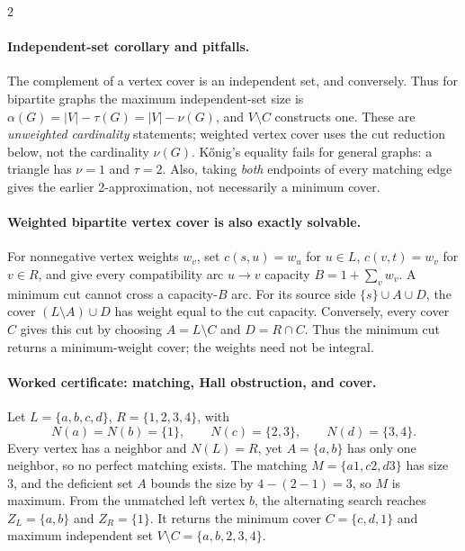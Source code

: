 \documentclass[8pt]{extarticle}
\theoremstyle{definition}
\begin{document}
\begin{multicols*}{2}
\paragraph{Independent-set corollary and pitfalls.}
The complement of a vertex cover is an independent set, and conversely.
Thus for bipartite graphs the maximum independent-set size is
$\alpha(G)=|V|-\tau(G)=|V|-\nu(G)$, and $V\setminus C$ constructs one.
These are \emph{unweighted cardinality} statements; weighted vertex cover
uses the cut reduction below, not the cardinality $\nu(G)$.
K\H{o}nig's equality fails for general graphs: a triangle has $\nu=1$ and
$\tau=2$. Also, taking \emph{both} endpoints of every matching edge gives
the earlier 2-approximation, not necessarily a minimum cover.

\begin{samepage}
\paragraph{Weighted bipartite vertex cover is also exactly solvable.}
For nonnegative vertex weights $w_v$, set $c(s,u)=w_u$ for $u\in L$,
$c(v,t)=w_v$ for $v\in R$, and give every compatibility arc $u\to v$
capacity $B=1+\sum_v w_v$. A minimum cut cannot cross a capacity-$B$ arc.
For its source side $\{s\}\cup A\cup D$, the cover
$(L\setminus A)\cup D$ has weight equal to the cut capacity.
Conversely, every cover $C$ gives this cut by choosing $A=L\setminus C$
and $D=R\cap C$. Thus the minimum cut returns a minimum-weight cover;
the weights need not be integral.\par
\end{samepage}

\paragraph{Worked certificate: matching, Hall obstruction, and cover.}
Let $L=\{a,b,c,d\}$, $R=\{1,2,3,4\}$, with
\[
 N(a)=N(b)=\{1\},\qquad N(c)=\{2,3\},\qquad N(d)=\{3,4\}.
\]
Every vertex has a neighbor and $N(L)=R$, yet $A=\{a,b\}$ has only one
neighbor, so no perfect matching exists. The matching
$M=\{a1,c2,d3\}$ has size 3, and the deficient set $A$ bounds the size
by $4-(2-1)=3$, so $M$ is maximum. From the unmatched left vertex $b$,
the alternating search reaches $Z_L=\{a,b\}$ and $Z_R=\{1\}$. It returns
the minimum cover $C=\{c,d,1\}$ and maximum independent set
$V\setminus C=\{a,b,2,3,4\}$.


\end{multicols*}
\end{document}
